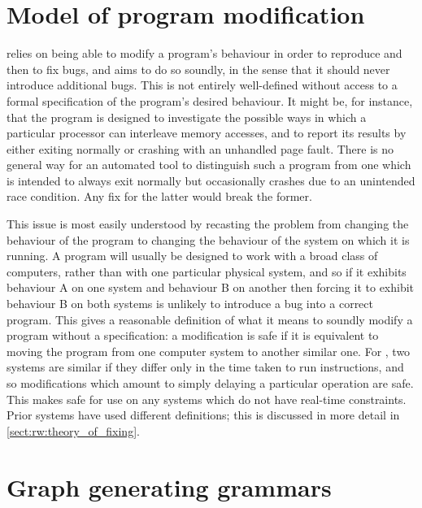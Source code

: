 \section{Model of program modification}
\label{sect:intro:theory_of_fixing}

{\Technique} relies on being able to modify a program's behaviour in
order to reproduce and then to fix bugs, and aims to do so soundly, in
the sense that it should never introduce additional bugs.  This is not
entirely well-defined without access to a formal specification of the
program's desired behaviour.  It might be, for instance, that the
program is designed to investigate the possible ways in which a
particular processor can interleave memory accesses, and to report its
results by either exiting normally or crashing with an unhandled page
fault.  There is no general way for an automated tool to distinguish
such a program from one which is intended to always exit normally but
occasionally crashes due to an unintended race condition.  Any fix for
the latter would break the former.

This issue is most easily understood by recasting the problem from
changing the behaviour of the program to changing the behaviour of the
system on which it is running.  A program will usually be designed to
work with a broad class of computers, rather than with one particular
physical system, and so if it exhibits behaviour A on one system and
behaviour B on another then forcing it to exhibit behaviour B on both
systems is unlikely to introduce a bug into a correct program.  This
gives a reasonable definition of what it means to soundly modify a
program without a specification: a modification is safe if it is
equivalent to moving the program from one computer system to another
similar one.  For {\technique}, two systems are similar if they differ
only in the time taken to run instructions, and so modifications which
amount to simply delaying a particular operation are safe.  This makes
{\technique} safe for use on any systems which do not have real-time
constraints.  Prior systems have used different definitions; this is
discussed in more detail in \autoref{sect:rw:theory_of_fixing}.

\section{Graph generating grammars}
\label{sect:intro:graph_grammar}


